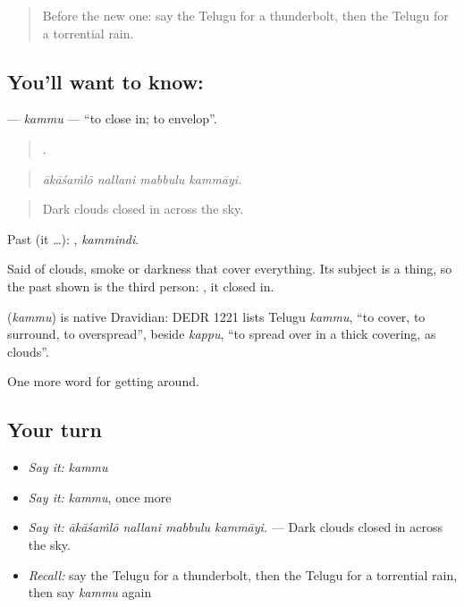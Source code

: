 \label{lesson:TE-C479-kammu}



\begin{quote}
Before the new one: say the Telugu for a thunderbolt, then the Telugu for a torrential rain.
\end{quote}

\subsection*{You'll want to know: }
\textbf{} — \emph{kammu} — \textquotedblleft{}to close in; to envelop\textquotedblright{}.

\begin{quote}
   .
\end{quote}

\begin{quote}
\emph{ākāśaṁlō nallani mabbulu kammāyi.}
\end{quote}

\begin{quote}
Dark clouds closed in across the sky.
\end{quote}

Past (it …): , \emph{kammindi}.

Said of clouds, smoke or darkness that cover everything. Its subject is a thing, so the past shown is the third person: , it closed in.

\begin{cousinweb}
\textbf{} (\emph{kammu}) is native Dravidian: DEDR 1221 lists Telugu \emph{kammu}, \textquotedblleft{}to cover, to surround, to overspread\textquotedblright{}, beside \emph{kappu}, \textquotedblleft{}to spread over in a thick covering, as clouds\textquotedblright{}.
\end{cousinweb}

\begin{grammarlens}[title={What you've built}]
One more word for getting around.
\end{grammarlens}

\subsection*{Your turn}
\begin{itemize}
\raggedright
  \item \emph{Say it:} \emph{kammu}
  \item \emph{Say it:} \emph{kammu}, once more
  \item \emph{Say it:} \emph{ākāśaṁlō nallani mabbulu kammāyi.} — Dark clouds closed in across the sky.
  \item \emph{Recall:} say the Telugu for a thunderbolt, then the Telugu for a torrential rain, then say \emph{kammu} again
\end{itemize}

